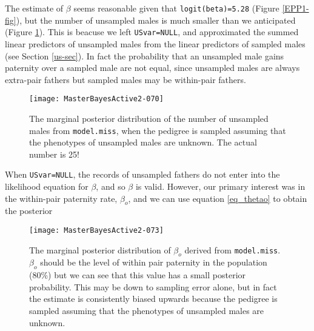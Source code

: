 \documentclass{article}
\begin{document}
The estimate of $\beta$ seems reasonable given that \texttt{logit(beta)=5.28} (Figure \ref{EPP1-fig}), but the number of unsampled males is much smaller than we anticipated (Figure \ref{EPP1US-fig}).  This is beacuse we left \texttt{USvar=NULL}, and approximated the summed linear predictors of unsampled males from the linear predictors of sampled males (see Section \ref{us-sec}).  In fact the probability that an unsampled male gains paternity over a sampled male are not equal, since unsampled males are always extra-pair fathers but sampled males may be within-pair fathers.\\


\begin{figure}[!h]
\begin{center}
\texttt{[image: MasterBayesActive2-070]}
\end{center}
\caption{The marginal posterior distribution of the number of unsampled males from \texttt{model.miss}, when the pedigree is sampled assuming that the phenotypes of unsampled males are unknown. The actual number is 25!}
\label{EPP1US-fig}
\end{figure}

When \texttt{USvar=NULL}, the records of unsampled fathers do not enter into the likelihood equation for $\beta$, and so $\beta$ is valid.  However, our primary interest was in the within-pair paternity rate, $\beta_{o}$, and we can use equation \ref{eq_thetao} to obtain the posterior

\begin{Schunk}
\end{Schunk}


\begin{figure}[!h]
\begin{center}
\texttt{[image: MasterBayesActive2-073]}
\end{center}
\caption{The marginal posterior distribution of $\beta_{o}$ derived from \texttt{model.miss}.  $\beta_{o}$ should be the level of within pair paternity in the population (80\%) but we can see that this value has a small posterior probability.  This may be down to sampling error alone, but in fact the estimate is consistently biased upwards because the pedigree is sampled assuming that the phenotypes of unsampled males are unknown.}
\label{EPP1Test-fig}
\end{figure}
\end{document}
